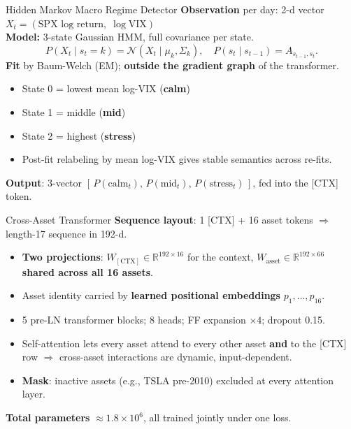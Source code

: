 \documentclass[10pt, aspectratio=169]{beamer}
\newcommand{\R}{\mathbb{R}}
\newcommand{\CTX}{[\mathrm{CTX}]}
\begin{document}
\begin{frame}{Hidden Markov Macro Regime Detector}
\textbf{Observation} per day: 2-d vector $X_t = (\text{SPX log return},\; \log \text{VIX})$
\vspace{0.3em}\\
\textbf{Model:} 3-state Gaussian HMM, full covariance per state.
\[
P(X_t \mid s_t = k) = \mathcal{N}(X_t \mid \mu_k, \Sigma_k),
\quad
P(s_t \mid s_{t-1}) = A_{s_{t-1}, s_t}.
\]
\textbf{Fit} by Baum-Welch (EM); \textbf{outside the gradient graph} of the transformer.
\vspace{0.2em}
\begin{itemize}\setlength{\itemsep}{1pt}\footnotesize
  \item State 0 = lowest mean log-VIX (\textbf{calm})
  \item State 1 = middle (\textbf{mid})
  \item State 2 = highest (\textbf{stress})
  \item Post-fit relabeling by mean log-VIX gives stable semantics across re-fits.
\end{itemize}
\vspace{0.2em}
\textbf{Output}: 3-vector $[\,P(\text{calm}_t),\,P(\text{mid}_t),\,P(\text{stress}_t)\,]$, fed into the [CTX] token.
\end{frame}

\begin{frame}{Cross-Asset Transformer}
\textbf{Sequence layout}: 1 [CTX] + 16 asset tokens $\Rightarrow$ length-17 sequence in 192-d.
\vspace{0.2em}
\begin{itemize}\setlength{\itemsep}{2pt}
  \item \textbf{Two projections}: $W_{\CTX}\!\in\!\R^{192\times 16}$ for the context, $W_{\text{asset}}\!\in\!\R^{192\times 66}$ \textbf{shared across all 16 assets}.
  \item Asset identity carried by \textbf{learned positional embeddings} $p_1,\dots,p_{16}$.
  \item 5 pre-LN transformer blocks; 8 heads; FF expansion $\times 4$; dropout 0.15.
  \item Self-attention lets every asset attend to every other asset \textbf{and} to the [CTX] row $\Rightarrow$ cross-asset interactions are dynamic, input-dependent.
  \item \textbf{Mask}: inactive assets (e.g., TSLA pre-2010) excluded at every attention layer.
\end{itemize}
\vspace{0.3em}
\textbf{Total parameters} $\approx 1.8 \times 10^{6}$, all trained jointly under one loss.
\end{frame}
\end{document}

